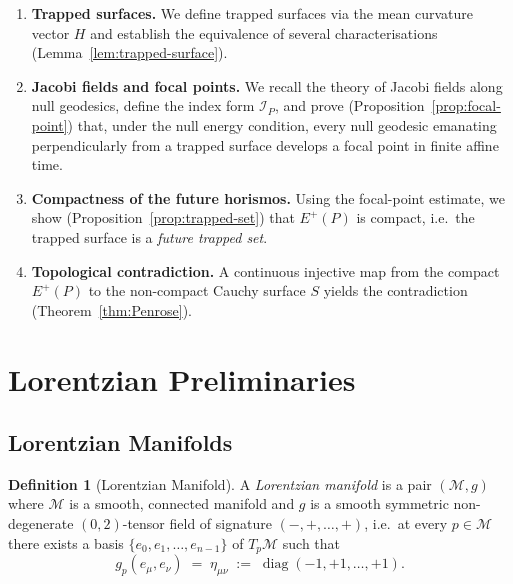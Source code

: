 \documentclass[12pt, a4paper]{article}
\theoremstyle{plain}
\theoremstyle{definition}
\newtheorem{definition}[theorem]{Definition}
\theoremstyle{remark}
\newcommand{\M}{\mathcal{M}}
\begin{document}
\begin{enumerate}
  \item \textbf{Trapped surfaces.}
    We define trapped surfaces via the mean curvature vector $H$ and
    establish the equivalence of several characterisations
    (Lemma~\ref{lem:trapped-surface}).

  \item \textbf{Jacobi fields and focal points.}
    We recall the theory of Jacobi fields along null geodesics,
    define the index form $\mathcal{I}_P$, and prove
    (Proposition~\ref{prop:focal-point}) that, under the null energy
    condition, every null geodesic emanating perpendicularly from a
    trapped surface develops a focal point in finite affine time.

  \item \textbf{Compactness of the future horismos.}
    Using the focal-point estimate, we show
    (Proposition~\ref{prop:trapped-set}) that $E^+(P)$ is compact,
    i.e.\ the trapped surface is a \emph{future trapped set}.

  \item \textbf{Topological contradiction.}
    A continuous injective map from the compact $E^+(P)$ to the
    non-compact Cauchy surface $S$ yields the contradiction
    (Theorem~\ref{thm:Penrose}).
\end{enumerate}

\section{Lorentzian Preliminaries}

\subsection{Lorentzian Manifolds}

\begin{definition}[Lorentzian Manifold]
  A \emph{Lorentzian manifold} is a pair $(\M, g)$ where $\M$ is a
  smooth, connected manifold and $g$ is a
  smooth symmetric non-degenerate $(0,2)$-tensor field of signature
  $(-,+,\ldots,+)$, i.e.\ at every $p \in \M$ there exists a basis
  $\{e_0, e_1, \ldots, e_{n-1}\}$ of $T_p\M$ such that
  \[
    g_p(e_\mu, e_\nu) \;=\; \eta_{\mu\nu}
    \;:=\; \operatorname{diag}(-1,+1,\ldots,+1).
  \]
\end{definition}
\end{document}
